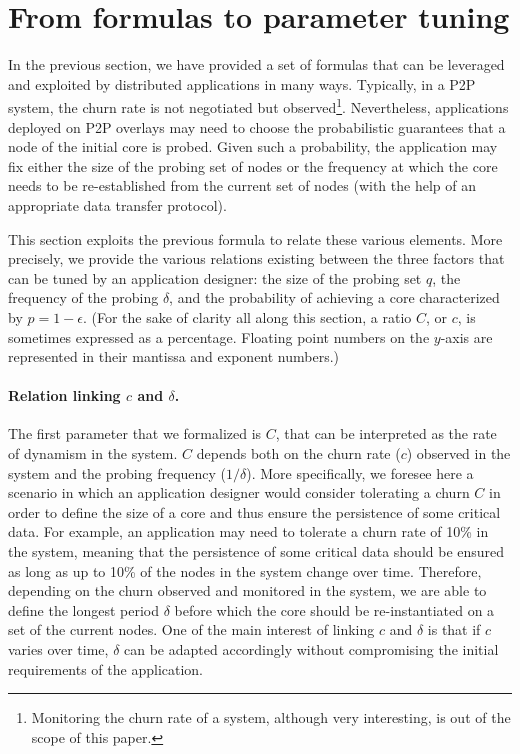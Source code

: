 \documentclass[]{llncs}
\begin{document}
\section{From formulas to parameter tuning}
\label{sec:interpretation}

In the  previous section, we  have provided a  set of formulas that  can be
leveraged   and    exploited   by   distributed    applications   in   many
ways. Typically,  in a  P2P system,  the churn rate  is not  negotiated but
observed\footnote{Monitoring the churn  rate of  a system,  although very
interesting, is   out  of  the   scope  of  this   paper.}.  Nevertheless,
applications deployed on P2P overlays  
 may   need  to  choose   the  probabilistic   guarantees  
 that a node of the initial core is probed.
Given such a probability, the application 
may fix  either  the  size of the probing set of  nodes or  the
frequency at  which the core  needs  to be re-established from the current
set of nodes (with the  help  of an appropriate data transfer protocol). 


This section  exploits  the previous  formula  to relate  these
various elements. More precisely, we 
provide the various  relations existing between the three  factors that can
be tuned by an application designer: 
the size of the probing set  $q$, the frequency of the probing $\delta$, and
the probability of achieving a core characterized by $p= 1-\epsilon$.
(For the sake of clarity all along this section, a ratio $C$, or  $c$,
is sometimes expressed as a  percentage.  
Floating point numbers on the $y$-axis are represented in 
their mantissa and exponent numbers.)


\paragraph{Relation linking $c$ and $\delta$.}

The first parameter that we formalized is $C$, that can be interpreted as
 the rate of dynamism in the system.  
$C$ depends  both  on the churn rate  ($c$) observed in the  system and the
 probing frequency  ($1/\delta$).
More specifically, we foresee here a scenario in which an application designer
would consider tolerating a churn $C$ in order to define 
the  size of   a core  and  thus ensure  the persistence  of some  critical
data. For example, an application may need to tolerate a churn rate of 10\%
in the system, meaning that the persistence of some critical data should be
ensured as  long as  up to  10\% of the  nodes in  the system  change  over
time.  Therefore, depending  on the  churn  observed and  monitored in  the
system, we are able to  define  the longest period $\delta$ before which the
core  should be re-instantiated on a set of the current nodes.  One of  the
main   interest of  linking  $c$   and  $\delta$  is  that if   $c$ varies
over time,  $\delta$  can  be  adapted   accordingly without  compromising
the  initial requirements of the application.  
\end{document}
